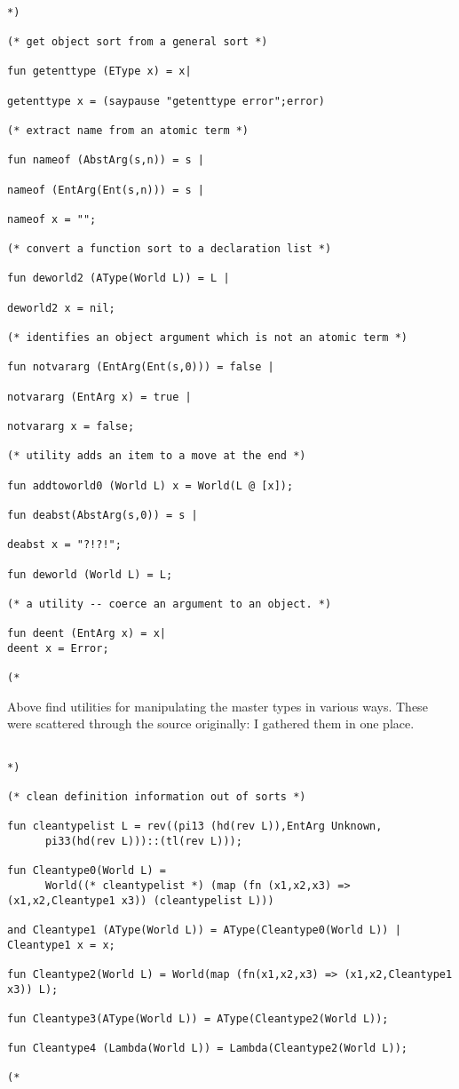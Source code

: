 \documentclass{article}
\begin{document}
\begin{verbatim}

*)

(* get object sort from a general sort *)

fun getenttype (EType x) = x|

getenttype x = (saypause "getenttype error";error)

(* extract name from an atomic term *)

fun nameof (AbstArg(s,n)) = s |

nameof (EntArg(Ent(s,n))) = s |

nameof x = "";

(* convert a function sort to a declaration list *)

fun deworld2 (AType(World L)) = L |

deworld2 x = nil;

(* identifies an object argument which is not an atomic term *)

fun notvararg (EntArg(Ent(s,0))) = false |

notvararg (EntArg x) = true |

notvararg x = false;

(* utility adds an item to a move at the end *)

fun addtoworld0 (World L) x = World(L @ [x]);

fun deabst(AbstArg(s,0)) = s |

deabst x = "?!?!";

fun deworld (World L) = L;

(* a utility -- coerce an argument to an object. *)

fun deent (EntArg x) = x|
deent x = Error;

(*

\end{verbatim}

Above find utilities for manipulating the master types in various ways.  These were scattered through the source originally:  I gathered them in one place.

\begin{verbatim}

*)

(* clean definition information out of sorts *)

fun cleantypelist L = rev((pi13 (hd(rev L)),EntArg Unknown,
      pi33(hd(rev L)))::(tl(rev L)));

fun Cleantype0(World L) =
      World((* cleantypelist *) (map (fn (x1,x2,x3) => (x1,x2,Cleantype1 x3)) (cleantypelist L)))

and Cleantype1 (AType(World L)) = AType(Cleantype0(World L)) |
Cleantype1 x = x;

fun Cleantype2(World L) = World(map (fn(x1,x2,x3) => (x1,x2,Cleantype1 x3)) L);

fun Cleantype3(AType(World L)) = AType(Cleantype2(World L));

fun Cleantype4 (Lambda(World L)) = Lambda(Cleantype2(World L));

(*

\end{verbatim}
\end{document}
